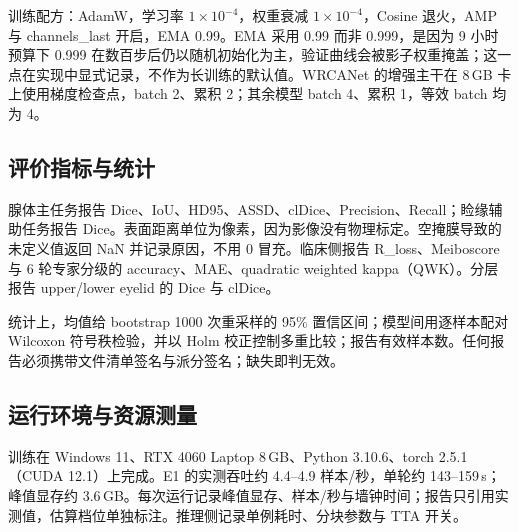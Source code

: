 训练配方：AdamW，学习率 $1\times10^{-4}$，权重衰减 $1\times10^{-4}$，Cosine 退火，AMP 与 channels\_last 开启，EMA 0.99。EMA 采用 0.99 而非 0.999，是因为 9 小时预算下 0.999 在数百步后仍以随机初始化为主，验证曲线会被影子权重掩盖；这一点在实现中显式记录，不作为长训练的默认值。WRCANet 的增强主干在 8\,GB 卡上使用梯度检查点，batch 2、累积 2；其余模型 batch 4、累积 1，等效 batch 均为 4。

\subsection{评价指标与统计}

腺体主任务报告 Dice、IoU、HD95、ASSD、clDice、Precision、Recall；睑缘辅助任务报告 Dice。表面距离单位为像素，因为影像没有物理标定。空掩膜导致的未定义值返回 NaN 并记录原因，不用 0 冒充。临床侧报告 R\_loss、Meiboscore 与 6 轮专家分级的 accuracy、MAE、quadratic weighted kappa（QWK）。分层报告 upper/lower eyelid 的 Dice 与 clDice。

统计上，均值给 bootstrap 1000 次重采样的 95\% 置信区间；模型间用逐样本配对 Wilcoxon 符号秩检验，并以 Holm 校正控制多重比较；报告有效样本数。任何报告必须携带文件清单签名与派分签名；缺失即判无效。

\subsection{运行环境与资源测量}

训练在 Windows 11、RTX 4060 Laptop 8\,GB、Python 3.10.6、torch 2.5.1（CUDA 12.1）上完成。E1 的实测吞吐约 4.4--4.9 样本/秒，单轮约 143--159\,s；峰值显存约 3.6\,GB。每次运行记录峰值显存、样本/秒与墙钟时间；报告只引用实测值，估算档位单独标注。推理侧记录单例耗时、分块参数与 TTA 开关。
